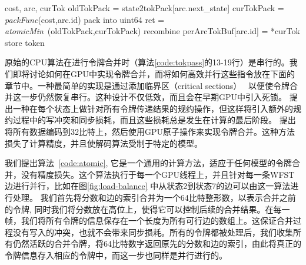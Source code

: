 \begin{algorithm}[ht]
\caption{线程级别的令牌合并算法 \textcolor[rgb]{0,0.5,0}{(Inputs: accumulated cost, an out-going WFST arc and a current token)}}
\label{code:atomic}
\begin{algorithmic}[1]
 {cost, arc, curTok}
\State oldTokPack = state2tokPack[arc.next\_state]
\State curTokPack = \textit{packFunc}(cost,arc.id) \Comment \textcolor[rgb]{0,0.5,0}{pack into uint64}
\State ret = \textit{atomicMin}~\footnotemark(oldTokPack,curTokPack)
         \Comment \textcolor[rgb]{0,0.5,0}{recombine}
\State  perArcTokBuf[arc.id] = *curTok \Comment \textcolor[rgb]{0,0.5,0}{store token}
\EndIf
\EndProcedure
\end{algorithmic}
\end{algorithm}


原始的CPU算法在进行令牌合并时（算法\ref{code:tokpass}的13-19行）是串行的。我们即将讨论如何在GPU中实现令牌合并，而将如何高效并行这些指令放在下面的章节中。一种最简单的实现是通过添加临界区（critical sections）~\cite{lamport1979make}
以便使令牌合并这一步仍然恢复串行。这种设计不仅低效，而且会在早期GPU中引入死锁。
\cite{you2009parallel} 提出一种在每个状态上做针对所有令牌传递结果的规约操作，但这样将引入额外的规约过程中的写冲突和同步损耗，而且这些损耗总是发生在计算的最后阶段。
%
\cite{kim2011h} 提出将所有数据编码到32比特上，然后使用GPU原子操作来实现令牌合并。这种方法损失了计算精度，并且使解码算法受制于特定的模型。

我们提出算法~\ref{code:atomic}, 它是一个通用的计算方法，适应于任何模型的令牌合并，没有精度损失。这个算法执行于每一个GPU线程上，并且针对每一条WFST边进行并行，比如在图\ref{fig:load-balance} 中从状态2到状态7的边可以由这一算法进行处理。
我们首先将分数和边的索引合并为一个64比特整形数，以表示合并之前的令牌, 同时我们将分数放在高位上，使得它可以控制后续的合并结果。在每一帧，我们将所有令牌的信息保存在一个长度为所有可行边的数组上。这保证合并过程没有写入的冲突，也就不会带来同步损耗。所有的令牌都被处理后，我们收集所有仍然活跃的合并令牌，将64比特数字返回原先的分数和边的索引，由此将真正的令牌信息存入相应的令牌中，而这一步也同样是并行进行的。


